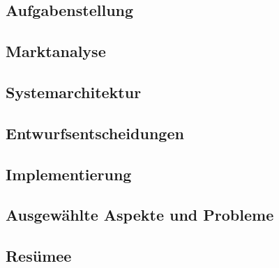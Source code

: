\documentclass[12pt,a4paper,titlepage,listof=totoc,bibliography=totoc,chapteratlists=0pt]{scrreprt}
\begin{document}
\begin{spacing}{1}
    \chapter{Aufgabenstellung}
\end{spacing}


\begin{spacing}{1}
    \chapter{Marktanalyse}
\end{spacing}


\begin{spacing}{1}
    \chapter{Systemarchitektur}\label{chapter:system-architecture}
\end{spacing}



\begin{spacing}{1}
    \chapter{Entwurfsentscheidungen}\label{chapter:Entwurfsentscheidungen}
\end{spacing}


\begin{spacing}{1}
    \chapter{Implementierung}\label{chapter:implementation}
\end{spacing}



\begin{spacing}{1}
    \chapter{Ausgewählte Aspekte und Probleme}\label{chapter:probleme}
\end{spacing}


\begin{spacing}{1}
    \chapter{Resümee}
\end{spacing}


\newpage
{}
\setcounter{page}{\value{RPages}}

\glsnogroupskiptrue
\printglossary[title=Glossar,toctitle=Glossar] %
\listoffigures
\listoftables
\lstlistoflistings
\appendix
{}

\newpage
{}
\end{document}
